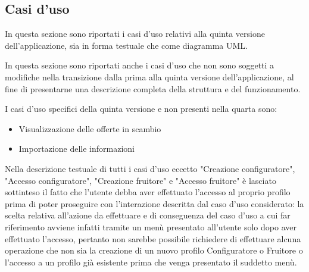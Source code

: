\subsection{Casi d'uso}
In questa sezione sono riportati i casi d'uso relativi alla quinta versione dell'applicazione, sia in forma testuale che come diagramma UML.\bigskip 

In questa sezione sono riportati anche i casi d'uso che non sono soggetti a modifiche nella transizione dalla prima alla quinta versione dell'applicazione, al fine di presentarne una descrizione completa della struttura e del funzionamento.\bigskip

I casi d'uso specifici della quinta versione e non presenti nella quarta sono:
\begin{itemize}
    \item Visualizzazione delle offerte in scambio
    \item Importazione delle informazioni
\end{itemize} \bigskip

Nella descrizione testuale di tutti i casi d'uso eccetto "Creazione configuratore", "Accesso configuratore", "Creazione fruitore" e "Accesso fruitore" è lasciato sottinteso il fatto che l'utente debba aver effettuato l'accesso al proprio profilo prima di poter proseguire con l'interazione descritta dal caso d'uso considerato: la scelta relativa all'azione da effettuare e di conseguenza del caso d'uso a cui far riferimento avviene infatti tramite un menù presentato all'utente solo dopo aver effettuato l'accesso, pertanto non sarebbe possibile richiedere di effettuare alcuna operazione che non sia la creazione di un nuovo profilo Configuratore o Fruitore o l'accesso a un profilo già esistente prima che venga presentato il suddetto menù.\bigskip



